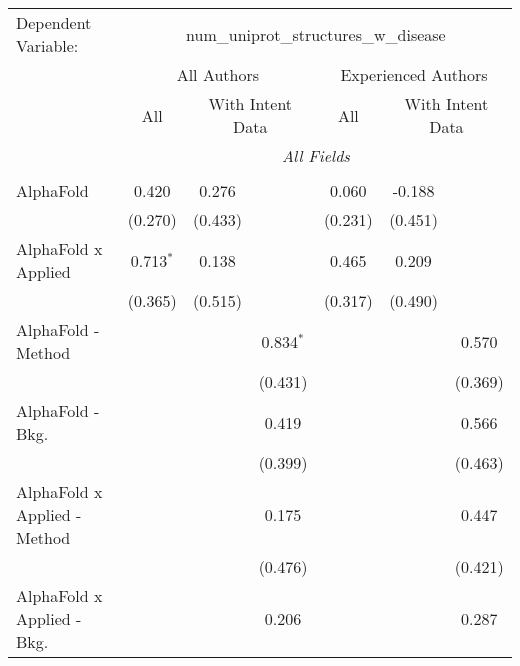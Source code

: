 \begingroup
\centering
\begin{tabular}{lcccccc}
   \tabularnewline \midrule \midrule
   Dependent Variable: & \multicolumn{6}{c}{num\_uniprot\_structures\_w\_disease}\\
 & \multicolumn{3}{c}{All Authors} & \multicolumn{3}{c}{Experienced Authors} \\
\cmidrule(lr){2-4} \cmidrule(lr){5-7}
 & \multicolumn{1}{c}{All} & \multicolumn{2}{c}{With Intent Data} & \multicolumn{1}{c}{All} & \multicolumn{2}{c}{With Intent Data} \\
\cmidrule(lr){2-2} \cmidrule(lr){3-4} \cmidrule(lr){5-5} \cmidrule(lr){6-7}
 & \multicolumn{6}{c}{\textit{All Fields}} \\ \\
   AlphaFold                      & 0.420         & 0.276         &               & 0.060         & -0.188        &   \\   
                                  & (0.270)       & (0.433)       &               & (0.231)       & (0.451)       &   \\   
   AlphaFold x Applied            & 0.713$^{*}$   & 0.138         &               & 0.465         & 0.209         &   \\   
                                  & (0.365)       & (0.515)       &               & (0.317)       & (0.490)       &   \\   
   AlphaFold - Method             &               &               & 0.834$^{*}$   &               &               & 0.570\\   
                                  &               &               & (0.431)       &               &               & (0.369)\\   
   AlphaFold - Bkg.               &               &               & 0.419         &               &               & 0.566\\   
                                  &               &               & (0.399)       &               &               & (0.463)\\   
   AlphaFold x Applied - Method   &               &               & 0.175         &               &               & 0.447\\   
                                  &               &               & (0.476)       &               &               & (0.421)\\   
   AlphaFold x Applied - Bkg.     &               &               & 0.206         &               &               & 0.287\\   

\end{tabular}

